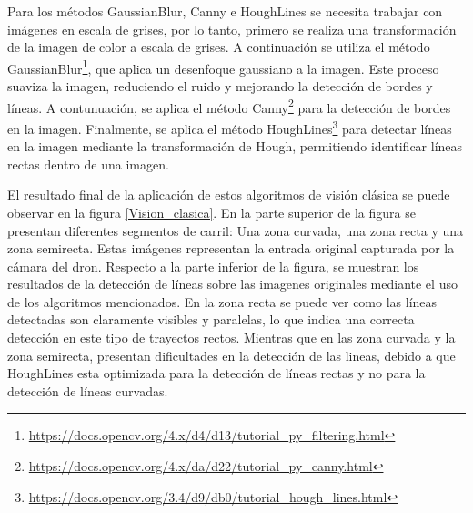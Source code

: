 Para los métodos GaussianBlur, Canny e HoughLines se necesita trabajar con imágenes en escala de grises, por lo tanto, primero se realiza una transformación de la imagen 
de color a escala de grises. A continuación se utiliza el método GaussianBlur\footnote{\url{https://docs.opencv.org/4.x/d4/d13/tutorial_py_filtering.html}}, que aplica un desenfoque 
gaussiano a la imagen. Este proceso suaviza la imagen, reduciendo el ruido y mejorando la detección de bordes y líneas. A contunuación, se aplica el método Canny\footnote{\url{https://docs.opencv.org/4.x/da/d22/tutorial_py_canny.html}} 
para la detección de bordes en la imagen. Finalmente, se aplica el método HoughLines\footnote{\url{https://docs.opencv.org/3.4/d9/db0/tutorial_hough_lines.html}}
para detectar líneas en la imagen mediante la transformación de Hough, permitiendo identificar líneas rectas dentro de una imagen. 

El resultado final de la aplicación de estos algoritmos de visión clásica se puede observar en la figura \ref{Vision_clasica}. En la parte superior de la figura se presentan diferentes segmentos
de carril: Una zona curvada, una zona recta y una zona semirecta. Estas imágenes representan la entrada original capturada por la cámara del dron. Respecto a la parte inferior de la figura, 
se muestran los resultados de la detección de líneas sobre las imagenes originales mediante el uso de los algoritmos mencionados. En la zona recta se puede ver como las líneas
detectadas son claramente visibles y paralelas, lo que indica una correcta detección en este tipo de trayectos rectos. Mientras que en las zona curvada y la zona semirecta, presentan
dificultades en la detección de las lineas, debido a que HoughLines esta optimizada para la detección de líneas rectas y no para la detección de líneas curvadas. 

